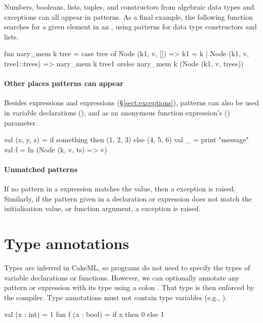 \documentclass[12pt,a4paper]{book}
\begin{document}
Numbers, booleans, lists, tuples, and constructors from algebraic data types and exceptions can all appear in
patterns. As a final example, the following function searches for a given
element in an , using patterns for data type constructors and lists.
\begin{smlcode}
fun nary_mem k tree =
  case tree of
    Node (k1, v, []) => k1 = k
  | Node (k1, v, tree1::trees) =>
    nary_mem k tree1 orelse nary_mem k (Node (k1, v, trees))
\end{smlcode}

\paragraph{Other places patterns can appear} Besides 
expressions and  expressions (\S\ref{sect:exceptions}),
patterns can also be used in variable declarations (), and as
an anonymous function expression's () parameter.
\begin{smlcode}
val (x, y, z) = if something then (1, 2, 3) else (4, 5, 6)
val _ = print "message"
val f = fn (Node (k, v, ts) => v)
\end{smlcode}

\paragraph{Unmatched patterns}
If no pattern in a  expression matches the value, then a  exception is raised. Similarly, if the pattern given in a  declaration or  expression does not match the initialisation value, or function argument, a  exception is raised.

\section{Type annotations}

Types are inferred in CakeML, so programs do not need to specify the types of
variable declarations or functions. However, we can optionally annotate any
pattern or expression with its type using a colon \smlinline{:}. That type is then enforced by the compiler. Type annotations must not contain type variables (e.g., ).
\begin{smlcode}
val (x : int) = 1
fun f (x : bool) = if x then 0 else 1
\end{smlcode}
\end{document}

